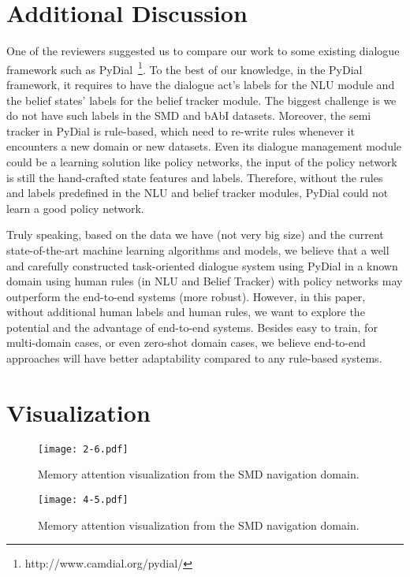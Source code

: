 \documentclass{article} \usepackage{iclr2019_conference,times}
\begin{document}
\section{Additional Discussion}
One of the reviewers suggested us to compare our work to some existing dialogue framework such as PyDial~\footnote{http://www.camdial.org/pydial/}. To the best of our knowledge, in the PyDial framework, it requires to have the dialogue act’s labels for the NLU module and the belief states’ labels for the belief tracker module. The biggest challenge is we do not have such labels in the SMD and bAbI datasets. Moreover, the semi tracker in PyDial is rule-based, which need to re-write rules whenever it encounters a new domain or new datasets. Even its dialogue management module could be a learning solution like policy networks, the input of the policy network is still the hand-crafted state features and labels. Therefore, without the rules and labels predefined in the NLU and belief tracker modules, PyDial could not learn a good policy network. 

Truly speaking, based on the data we have (not very big size) and the current state-of-the-art machine learning algorithms and models, we believe that a well and carefully constructed task-oriented dialogue system using PyDial in a known domain using human rules (in NLU and Belief Tracker) with policy networks may outperform the end-to-end systems (more robust). However, in this paper, without additional human labels and human rules, we want to explore the potential and the advantage of end-to-end systems. Besides easy to train, for multi-domain cases, or even zero-shot domain cases, we believe end-to-end approaches will have better adaptability compared to any rule-based systems.

\pagebreak

\section{Visualization}
\begin{figure}[h]
\centering
\texttt{[image: 2-6.pdf]} \caption{Memory attention visualization from the SMD navigation domain.}
\end{figure}

\begin{figure}[h]
\centering
\texttt{[image: 4-5.pdf]} \caption{Memory attention visualization from the SMD navigation domain.}
\end{figure}
\end{document}

